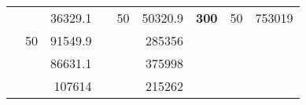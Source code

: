 \begin{table}[H]
\begin{tabular}{|ccrccrccc}
\rowcolor[HTML]{DDFDFF} 
\multicolumn{1}{|c|}{\cellcolor[HTML]{FFFFC7}}                                & \multicolumn{1}{c|}{\cellcolor[HTML]{DDFDFF}}                      & \multicolumn{1}{r|}{\cellcolor[HTML]{DAE8FC}36329.1}   & \multicolumn{1}{c|}{\cellcolor[HTML]{FFFFC7}}                                & \multicolumn{1}{c|}{\multirow{-10}{*}{\cellcolor[HTML]{DDFDFF}50}}  & \multicolumn{1}{r|}{\cellcolor[HTML]{DDFDFF}50320.9}   & \multicolumn{1}{c|}{\multirow{-19}{*}{\cellcolor[HTML]{FFFFC7}\textbf{300}}} & \multicolumn{1}{c|}{\multirow{-10}{*}{\cellcolor[HTML]{DDFDFF}50}} & \multicolumn{1}{r|}{\cellcolor[HTML]{DDFDFF}753019}    \\ \cline{3-3} \cline{5-9} 
\multicolumn{1}{|c|}{\cellcolor[HTML]{FFFFC7}}                                & \multicolumn{1}{c|}{\multirow{-10}{*}{\cellcolor[HTML]{DDFDFF}50}} & \multicolumn{1}{r|}{\cellcolor[HTML]{DDFDFF}91549.9}   & \multicolumn{1}{c|}{\cellcolor[HTML]{FFFFC7}}                                & \multicolumn{1}{c|}{\cellcolor[HTML]{DAE8FC}}                       & \multicolumn{1}{r|}{\cellcolor[HTML]{DAE8FC}285356}    &                                                                              &                                                                    &                                                        \\ \cline{2-3} \cline{6-6}
\multicolumn{1}{|c|}{\cellcolor[HTML]{FFFFC7}}                                & \multicolumn{1}{c|}{\cellcolor[HTML]{DAE8FC}}                      & \multicolumn{1}{r|}{\cellcolor[HTML]{DAE8FC}86631.1}   & \multicolumn{1}{c|}{\cellcolor[HTML]{FFFFC7}}                                & \multicolumn{1}{c|}{\cellcolor[HTML]{DAE8FC}}                       & \multicolumn{1}{r|}{\cellcolor[HTML]{DDFDFF}375998}    &                                                                              &                                                                    &                                                        \\ \cline{3-3} \cline{6-6}
\multicolumn{1}{|c|}{\cellcolor[HTML]{FFFFC7}}                                & \multicolumn{1}{c|}{\cellcolor[HTML]{DAE8FC}}                      & \multicolumn{1}{r|}{\cellcolor[HTML]{DDFDFF}107614}    & \multicolumn{1}{c|}{\cellcolor[HTML]{FFFFC7}}                                & \multicolumn{1}{c|}{\cellcolor[HTML]{DAE8FC}}                       & \multicolumn{1}{r|}{\cellcolor[HTML]{DAE8FC}215262}    &                                                                              &                                                                    &                                                        \\ \cline{3-3} \cline{6-6}

\end{tabular}
\end{table}

